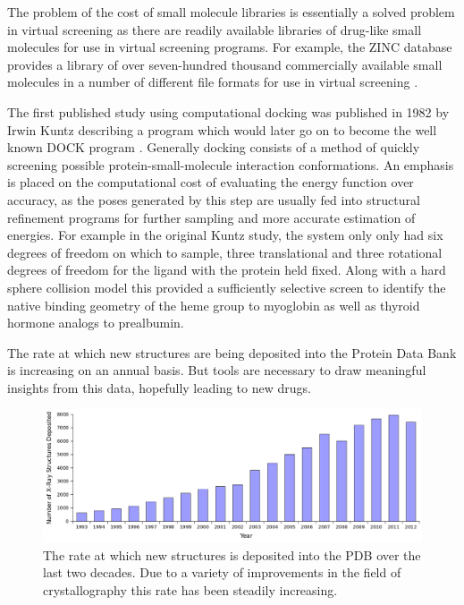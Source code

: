 The problem of the cost of small molecule libraries is essentially a solved problem in virtual screening as there are readily available libraries of drug-like small molecules for use in virtual screening programs.
For example, the ZINC database provides a library of over seven-hundred thousand commercially available small molecules in a number of different file formats for use in virtual screening \cite{irwin2005zinc}.

 \cite{kitchen2004docking}

The first published study using computational docking was published in 1982 by Irwin Kuntz describing a program which would later go on to become the well known DOCK program \cite{kuntz1982geometric}.
Generally docking consists of a method of quickly screening possible protein-small-molecule interaction conformations.
An emphasis is placed on the computational cost of evaluating the energy function over accuracy, as the poses generated by this step are usually fed into structural refinement programs for further sampling and more accurate estimation of energies.
For example in the original Kuntz study, the system only only had six degrees of freedom on which to sample, three translational and three rotational degrees of freedom for the ligand with the protein held fixed.
Along with a hard sphere collision model this provided a sufficiently selective screen to identify the native binding geometry of the heme group to myoglobin as well as thyroid hormone analogs to prealbumin. 
 \cite{kuntz1982geometric}

The rate at which new structures are being deposited into the Protein Data Bank is increasing on an annual basis.
But tools are necessary to draw meaningful insights from this data, hopefully leading to new drugs.

\begin{figure}[H]
\begin{center}
\includegraphics[width=\textwidth]{figures/pdb_deposit_rate.png}
\caption{The rate at which new structures is deposited into the PDB over the last two decades.
Due to a variety of improvements in the field of crystallography this rate has been steadily increasing.}
\label{figure:pdb_growth}
\end{center}
\end{figure}

